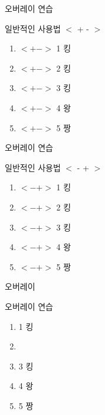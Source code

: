 \documentclass[10pt,blue,xcolor=pdftex,dvipsnames,table,handout]{beamer}
\begin{document}
		\begin{frame}[t]{오버레이 연습 }

			\begin{block} {일반적인 사용법 $<$ + - $>$}
			\begin{enumerate}
			\item <+-> $<+->$ 1 킹
			\item <+-> $<+->$ 2 킹
			\item <+-> $<+->$ 3 킹
			\item <+-> $<+->$ 4 왕
			\item <+-> $<+->$ 5 짱
			\end{enumerate}
			\end{block}

		\end{frame}



		\begin{frame}[t]{오버레이 연습 }

			\begin{block} {일반적인 사용법 $<$ - + $>$}
			\begin{enumerate}
			\item <-+> $<-+>$ 1 킹
			\item <-+> $<-+>$ 2 킹
			\item <-+> $<-+>$ 3 킹
			\item <-+> $<-+>$ 4 왕
			\item <-+> $<-+>$ 5 짱
			\end{enumerate}
			\end{block}

		\end{frame}




		\begin{frame}[t]{오버레이}

			\begin{block} {오버레이 연습}
			\begin{enumerate}
			\item <1-6> 1 킹
			\item <2-6> 
			\item <3-6> 3 킹
			\item <4-6> 4 왕
			\item <5-6> 5 짱
			
			\end{enumerate}
			\end{block}

		\end{frame}




\end{document}
